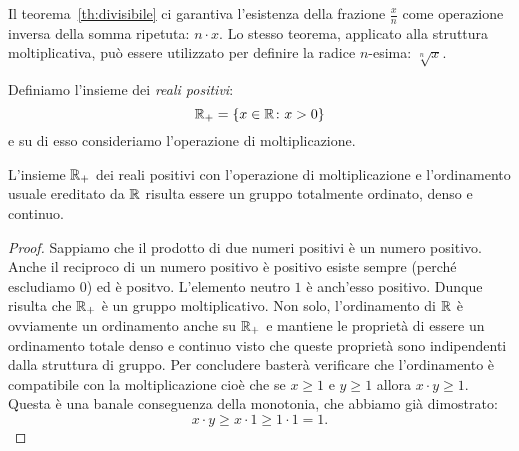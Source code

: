 Il teorema~\ref{th:divisibile}
ci garantiva l'esistenza della frazione $\frac x n$ come operazione inversa 
della somma ripetuta: $n\cdot x$. 
Lo stesso teorema, applicato alla struttura moltiplicativa, può essere utilizzato 
per definire la radice $n$-esima: $\sqrt[n]{x}$.

Definiamo l'insieme dei \emph{reali positivi}:
\[
{\mathbb R}_+ = {\left\{ x\in {\mathbb R}\colon x>0 \right\}}
\]
e su di esso consideriamo l'operazione di moltiplicazione.

\begin{theorem}
  \label{th:gruppo_moltiplicativo}%
L'insieme ${\mathbb R}_+$ dei reali positivi con l'operazione di moltiplicazione 
e l'ordinamento usuale ereditato da ${\mathbb R}$ risulta essere 
un gruppo totalmente ordinato, denso e continuo.
\end{theorem}
%
\begin{proof}
Sappiamo che il prodotto di due numeri positivi 
è un numero positivo. Anche il reciproco di un numero positivo è positivo 
esiste sempre (perché escludiamo $0$) ed è positvo. 
L'elemento neutro $1$ è anch'esso positivo. 
Dunque risulta che ${\mathbb R}_+$ è un gruppo moltiplicativo.
Non solo, l'ordinamento di ${\mathbb R}$ è ovviamente un ordinamento anche su ${\mathbb R}_+$
e mantiene le proprietà di essere un ordinamento totale 
denso e continuo visto che queste proprietà sono indipendenti dalla struttura di gruppo.
Per concludere basterà verificare che l'ordinamento è compatibile con la moltiplicazione
cioè che se $x\ge 1$ e $y\ge 1$ allora $x\cdot y\ge 1$. 
Questa è una banale conseguenza della monotonia, che abbiamo già dimostrato:
\[
 x\cdot y \ge x\cdot 1 \ge 1\cdot 1 = 1.  
\]
\end{proof}

